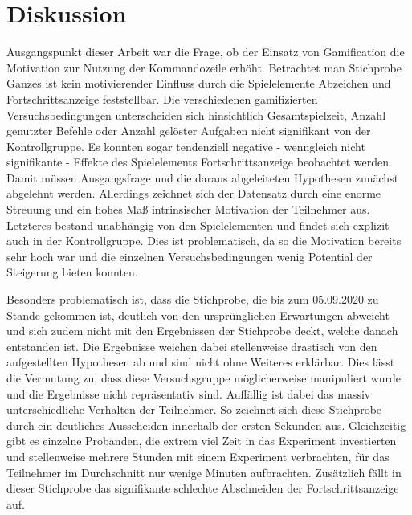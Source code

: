 \section{Diskussion}
Ausgangspunkt dieser Arbeit war die Frage, ob der Einsatz von Gamification die Motivation zur Nutzung der Kommandozeile erhöht. Betrachtet man Stichprobe Ganzes ist kein motivierender Einfluss durch die Spielelemente Abzeichen und Fortschrittsanzeige feststellbar. Die verschiedenen gamifizierten Versuchsbedingungen unterscheiden sich hinsichtlich Gesamtspielzeit, Anzahl genutzter Befehle oder Anzahl gelöster Aufgaben nicht signifikant von der Kontrollgruppe. Es konnten sogar tendenziell negative - wenngleich nicht signifikante - Effekte des Spielelements Fortschrittsanzeige beobachtet werden. Damit müssen Ausgangsfrage und die daraus abgeleiteten Hypothesen zunächst abgelehnt werden. Allerdings zeichnet sich der Datensatz durch eine enorme Streuung und ein hohes Maß intrinsischer Motivation der Teilnehmer aus. Letzteres bestand unabhängig von den Spielelementen und findet sich explizit auch in der Kontrollgruppe. Dies ist problematisch, da so die Motivation bereits sehr hoch war und die einzelnen Versuchsbedingungen wenig Potential der Steigerung bieten konnten.

Besonders problematisch ist, dass die Stichprobe, die bis zum 05.09.2020 zu Stande gekommen ist, deutlich von den ursprünglichen Erwartungen abweicht und sich zudem nicht mit den Ergebnissen der Stichprobe deckt, welche danach entstanden ist. Die Ergebnisse weichen dabei stellenweise drastisch von den aufgestellten Hypothesen ab und sind nicht ohne Weiteres erklärbar. Dies lässt die Vermutung zu, dass diese Versuchsgruppe möglicherweise manipuliert wurde und die Ergebnisse nicht repräsentativ sind. Auffällig ist dabei das massiv unterschiedliche Verhalten der Teilnehmer. So zeichnet sich diese Stichprobe durch ein deutliches Ausscheiden innerhalb der ersten Sekunden aus. Gleichzeitig gibt es einzelne Probanden, die extrem viel Zeit in das Experiment investierten und stellenweise mehrere Stunden mit einem Experiment verbrachten, für das Teilnehmer im Durchschnitt nur wenige Minuten aufbrachten. Zusätzlich fällt in dieser Stichprobe das signifikante schlechte Abschneiden der Fortschrittsanzeige auf.

